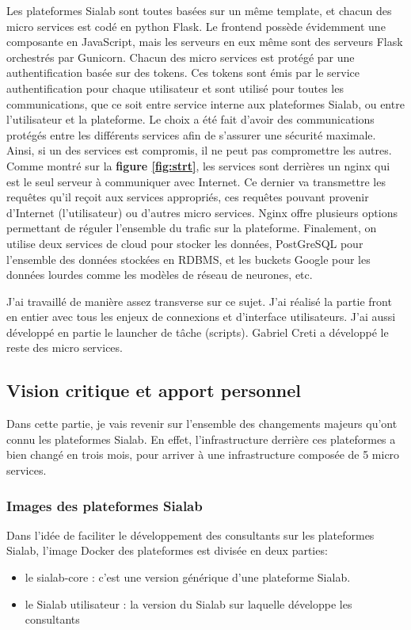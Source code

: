 \documentclass{article} %
\begin{document}
Les plateformes Sialab sont toutes basées sur un même template, et chacun des micro services est codé en python Flask. Le frontend possède évidemment une composante en JavaScript, mais les serveurs en eux même sont des serveurs Flask orchestrés par Gunicorn. Chacun des micro services est protégé par une authentification basée sur des tokens. Ces tokens sont émis par le service authentification pour chaque utilisateur et sont utilisé pour toutes les communications, que ce soit entre service interne aux plateformes Sialab, ou entre l'utilisateur et la plateforme. Le choix a été fait d'avoir des communications protégés entre les différents services afin de s'assurer une sécurité maximale. Ainsi, si un des services est compromis, il ne peut pas compromettre les autres.\\

Comme montré sur la \textbf{figure \ref{fig:strt}}, les services sont derrières un nginx \cite{nginx} qui est le seul serveur à communiquer avec Internet. Ce dernier va transmettre les requêtes qu'il reçoit aux services appropriés, ces requêtes pouvant provenir d'Internet (l'utilisateur) ou d'autres micro services. Nginx offre plusieurs options permettant de réguler l'ensemble du trafic sur la plateforme. Finalement, on utilise deux services de cloud pour stocker les données, PostGreSQL pour l'ensemble des données stockées en RDBMS, et les buckets Google pour les données lourdes comme les modèles de réseau de neurones, etc. 

J'ai travaillé de manière assez transverse sur ce sujet. J'ai réalisé la partie front en entier avec tous les enjeux de connexions et d'interface utilisateurs. J'ai aussi développé en partie le launcher de tâche (scripts). Gabriel Creti a développé le reste des micro services.


\subsection{Vision critique et apport personnel}
Dans cette partie, je vais revenir sur l'ensemble des changements majeurs qu'ont connu les plateformes Sialab. En effet, l'infrastructure derrière ces plateformes a bien changé en trois mois, pour arriver à une infrastructure composée de 5 micro services.

\subsubsection{Images des plateformes Sialab}
Dans l'idée de faciliter le développement des consultants sur les plateformes Sialab, l'image Docker des plateformes est divisée en deux parties:
\begin{itemize}
 \item le sialab-core : c'est une version générique d'une plateforme Sialab.
 \item le Sialab utilisateur : la version du Sialab sur laquelle développe les consultants
\end{itemize}
\end{document}
